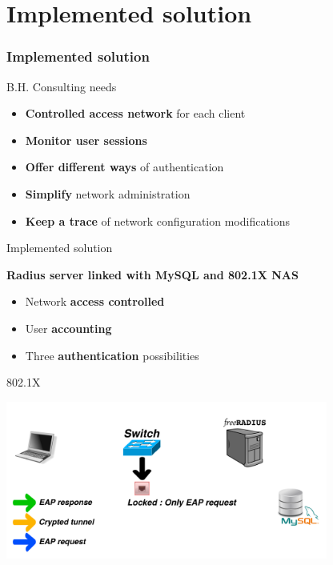 \documentclass[12pt]{beamer}
\begin{document}
\part{Implemented solution}
\frame{\partpage}
\section{Implemented solution}

\begin{frame}{B.H. Consulting needs}
    \begin{itemize}[<+->]
	\item \textbf{Controlled access network} for each client
	\vfill
	\item \textbf{Monitor user sessions}
	\vfill 
	\item \textbf{Offer different ways} of authentication
	\vfill
	\item \textbf{Simplify} network administration
	\vfill
	\item \textbf{Keep a trace} of network configuration modifications
    \end{itemize}
\end{frame}

\begin{frame}{Implemented solution}
    \begin{center}
    \textbf{Radius server linked with MySQL and 802.1X NAS}
    \end{center}

    \pause
    \begin{itemize}[<+->]\vfill
	\item Network \textbf{access controlled}\vfill
	\item User \textbf{accounting}\vfill
	\item Three \textbf{authentication} possibilities\vfill
    \end{itemize}
\end{frame}

\begin{frame}{802.1X}
\vfill
\begin{center}
    \includegraphics[width=300pt]{img/dot1x_1.pdf}
\end{center}
\vfill
\end{frame}
\end{document}
